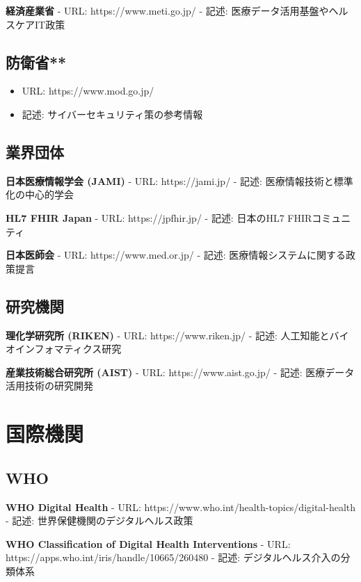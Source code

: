 \documentclass[
  a4paper,
  a4paper,
  11pt]{ltjsbook}
\providecommand{\tightlist}{%
  \setlength{\itemsep}{0pt}\setlength{\parskip}{0pt}}
\begin{document}
\textbf{経済産業省} - URL: https://www.meti.go.jp/ - 記述:
医療データ活用基盤やヘルスケアIT政策

\subsection{防衛省**}\label{ux9632ux885bux7701}

\begin{itemize}
\tightlist
\item
  URL: https://www.mod.go.jp/
\item
  記述: サイバーセキュリティ策の参考情報
\end{itemize}

\subsection{業界団体}\label{ux696dux754cux56e3ux4f53}

\textbf{日本医療情報学会 (JAMI)} - URL: https://jami.jp/ - 記述:
医療情報技術と標準化の中心的学会

\textbf{HL7 FHIR Japan} - URL: https://jpfhir.jp/ - 記述: 日本のHL7
FHIRコミュニティ

\textbf{日本医師会} - URL: https://www.med.or.jp/ - 記述:
医療情報システムに関する政策提言

\subsection{研究機関}\label{ux7814ux7a76ux6a5fux95a2}

\textbf{理化学研究所 (RIKEN)} - URL: https://www.riken.jp/ - 記述:
人工知能とバイオインフォマティクス研究

\textbf{産業技術総合研究所 (AIST)} - URL: https://www.aist.go.jp/ -
記述: 医療データ活用技術の研究開発

\section{国際機関}\label{ux56fdux969bux6a5fux95a2}

\subsection{WHO}\label{who}

\textbf{WHO Digital Health} - URL:
https://www.who.int/health-topics/digital-health - 記述:
世界保健機関のデジタルヘルス政策

\textbf{WHO Classification of Digital Health Interventions} - URL:
https://apps.who.int/iris/handle/10665/260480 - 記述:
デジタルヘルス介入の分類体系
\end{document}
